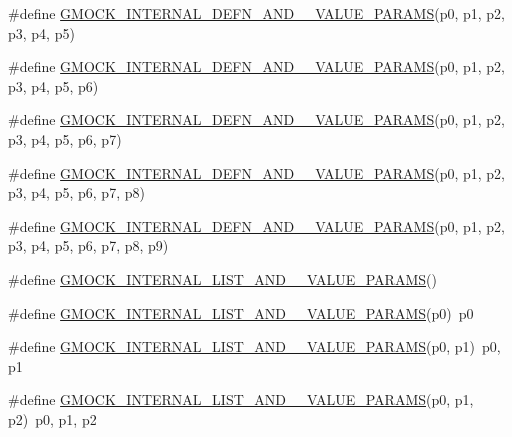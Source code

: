 \begin{DoxyCompactItemize}
\item 
\#define \hyperlink{gmock-generated-actions_8h_a4ba5920542abfa689a6517d21eb8860a}{G\+M\+O\+C\+K\+\_\+\+I\+N\+T\+E\+R\+N\+A\+L\+\_\+\+D\+E\+F\+N\+\_\+\+A\+N\+D\+\_\+\_\+\+V\+A\+L\+U\+E\+\_\+\+P\+A\+R\+A\+MS}(p0,  p1,  p2,  p3,  p4,  p5)
\item 
\#define \hyperlink{gmock-generated-actions_8h_aa0f3292bceb484af4271eb50de9d5ead}{G\+M\+O\+C\+K\+\_\+\+I\+N\+T\+E\+R\+N\+A\+L\+\_\+\+D\+E\+F\+N\+\_\+\+A\+N\+D\+\_\+\_\+\+V\+A\+L\+U\+E\+\_\+\+P\+A\+R\+A\+MS}(p0,  p1,  p2,  p3,  p4,  p5,  p6)
\item 
\#define \hyperlink{gmock-generated-actions_8h_a028ed15e5ba3301a85b859792e9fb7c9}{G\+M\+O\+C\+K\+\_\+\+I\+N\+T\+E\+R\+N\+A\+L\+\_\+\+D\+E\+F\+N\+\_\+\+A\+N\+D\+\_\+\_\+\+V\+A\+L\+U\+E\+\_\+\+P\+A\+R\+A\+MS}(p0,  p1,  p2,  p3,  p4,  p5,  p6,  p7)
\item 
\#define \hyperlink{gmock-generated-actions_8h_a9565bbd3c2624487ccb71f325fd96596}{G\+M\+O\+C\+K\+\_\+\+I\+N\+T\+E\+R\+N\+A\+L\+\_\+\+D\+E\+F\+N\+\_\+\+A\+N\+D\+\_\+\_\+\+V\+A\+L\+U\+E\+\_\+\+P\+A\+R\+A\+MS}(p0,  p1,  p2,  p3,  p4,  p5,  p6,  p7,  p8)
\item 
\#define \hyperlink{gmock-generated-actions_8h_aea3f6f518db8ecc3b63341f38a7c4eaf}{G\+M\+O\+C\+K\+\_\+\+I\+N\+T\+E\+R\+N\+A\+L\+\_\+\+D\+E\+F\+N\+\_\+\+A\+N\+D\+\_\+\_\+\+V\+A\+L\+U\+E\+\_\+\+P\+A\+R\+A\+MS}(p0,  p1,  p2,  p3,  p4,  p5,  p6,  p7,  p8,  p9)
\item 
\#define \hyperlink{gmock-generated-actions_8h_a2dbeccb9f6d632f5e7e2c1421cd549aa}{G\+M\+O\+C\+K\+\_\+\+I\+N\+T\+E\+R\+N\+A\+L\+\_\+\+L\+I\+S\+T\+\_\+\+A\+N\+D\+\_\+\_\+\+V\+A\+L\+U\+E\+\_\+\+P\+A\+R\+A\+MS}()
\item 
\#define \hyperlink{gmock-generated-actions_8h_a12895511e72c47c78850542b68fe83d4}{G\+M\+O\+C\+K\+\_\+\+I\+N\+T\+E\+R\+N\+A\+L\+\_\+\+L\+I\+S\+T\+\_\+\+A\+N\+D\+\_\+\_\+\+V\+A\+L\+U\+E\+\_\+\+P\+A\+R\+A\+MS}(p0)~p0
\item 
\#define \hyperlink{gmock-generated-actions_8h_ac0efec20319ea66c5508b6e5ad42c357}{G\+M\+O\+C\+K\+\_\+\+I\+N\+T\+E\+R\+N\+A\+L\+\_\+\+L\+I\+S\+T\+\_\+\+A\+N\+D\+\_\+\_\+\+V\+A\+L\+U\+E\+\_\+\+P\+A\+R\+A\+MS}(p0,  p1)~p0, p1
\item 
\#define \hyperlink{gmock-generated-actions_8h_a10f92233f148b19f341e1a17267107d3}{G\+M\+O\+C\+K\+\_\+\+I\+N\+T\+E\+R\+N\+A\+L\+\_\+\+L\+I\+S\+T\+\_\+\+A\+N\+D\+\_\+\_\+\+V\+A\+L\+U\+E\+\_\+\+P\+A\+R\+A\+MS}(p0,  p1,  p2)~p0, p1, p2
\item 

\end{DoxyCompactItemize}
